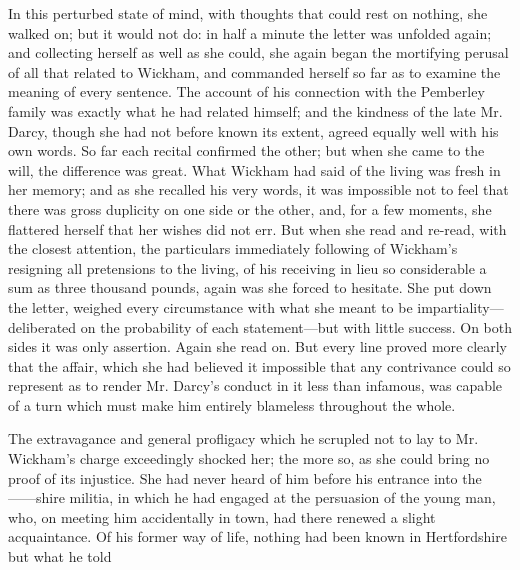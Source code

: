 In this perturbed state of mind, with thoughts that could rest on nothing, she walked on; but it would not do: in half a minute the letter was unfolded again; and collecting herself as well as she could, she again began the mortifying perusal of all that related to Wickham, and commanded herself so far as to examine the meaning of every sentence. The account of his connection with the Pemberley family was exactly what he had related himself; and the kindness of the late Mr. Darcy, though she had not before known its extent, agreed equally well with his own words. So far each recital confirmed the other; but when she came to the will, the difference was great. What Wickham had said of the living was fresh in her memory; and as she recalled his very words, it was impossible not to feel that there was gross duplicity on one side or the other, and, for a few moments, she flattered herself that her wishes did not err. But when she read and re-read, with the closest attention, the particulars immediately following of Wickham's resigning all pretensions to the living, of his receiving in lieu so considerable a sum as three thousand pounds, again was she forced to hesitate. She put down the letter, weighed every circumstance with what she meant to be impartiality---deliberated on the probability of each statement---but with little success. On both sides it was only assertion. Again she read on. But every line proved more clearly that the affair, which she had believed it impossible that any contrivance could so represent as to render Mr. Darcy's conduct in it less than infamous, was capable of a turn which must make him entirely blameless throughout the whole.

The extravagance and general profligacy which he scrupled not to lay to Mr. Wickham's charge exceedingly shocked her; the more so, as she could bring no proof of its injustice. She had never heard of him before his entrance into the ------shire militia, in which he had engaged at the persuasion of the young man, who, on meeting him accidentally in town, had there renewed a slight acquaintance. Of his former way of life, nothing had been known in Hertfordshire but what he told



